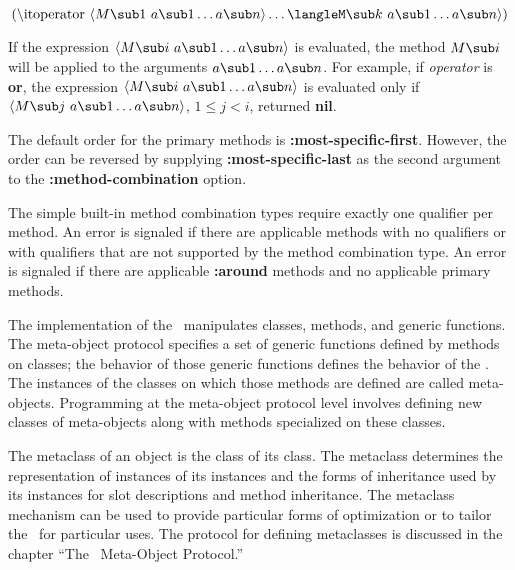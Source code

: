 $$(\hbox{{\it operator}}\ \langle M\sub  1%
\ a\sub 1\ldots a\sub n\rangle\ldots\langle%
M\sub k\ a\sub 1\ldots a\sub n\rangle)$$

\item{} If the expression $\langle M\sub i \ a\sub 1\ldots a\sub
n\rangle$ is
evaluated, the method $M\sub i$ will be applied to the arguments
$a\sub 1\ldots a\sub n$.  
For example,
if {\it operator\/} is {\bf or},
the expression $\langle M\sub i \ a\sub 1\ldots a\sub n\rangle$ is
evaluated only if $\langle M\sub j \ a\sub 1\ldots a\sub n\rangle$,
$1\leq j<i$, returned {\bf nil}.

\item{} The default order for the primary methods is {\bf
:most-specific-first}.  However, the order can be reversed by supplying
{\bf :most-specific-last} as the second argument to the {\bf
:method-combination} option.  \endlist

\goodbreak

The simple built-in method combination types require exactly one qualifier per
method.  An error is signaled if there are applicable methods with no
qualifiers or with qualifiers that are not supported by the method
combination type. An error is signaled if there are applicable {\bf :around}
methods and no applicable primary methods.

\endsubSection%

\endSection%


The implementation of the \OS\ manipulates classes, methods, and generic
functions.  The meta-object protocol specifies a set of generic
functions defined by methods on classes; the behavior of those generic
functions defines the behavior of the \OS.  The instances of the classes
on which those methods are defined are called {\bit meta-objects}.  Programming
at the meta-object protocol level involves defining new classes of
meta-objects along with methods specialized on these classes.


The {\bit metaclass\/} of an object is the class of its class.  The
metaclass determines the representation of instances of its instances and
the forms of inheritance used by its instances for slot descriptions and
method inheritance.  The metaclass mechanism can be used to provide
particular forms of optimization or to tailor the \CLOS\ for particular
uses.  The protocol for defining metaclasses is discussed in the chapter
``The \CLOS\ Meta-Object Protocol.''

